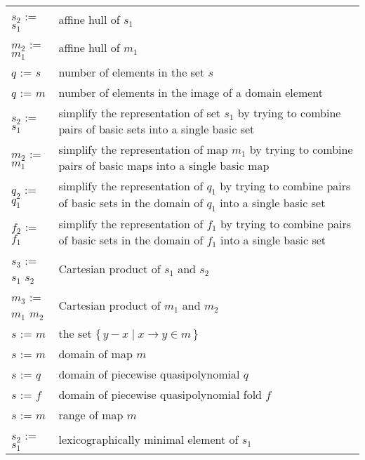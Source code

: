 \label{t:iscc}
\tablelasttail{}
\begin{supertabular}{lp{0.7\textwidth}}
$s_2$ :=  $s_1$ & affine hull of $s_1$
\\
$m_2$ :=  $m_1$ & affine hull of $m_1$
\\
$q$ :=  $s$ &
number of elements in the set $s$
\\
$q$ :=  $m$ &
number of elements in the image of a domain element
\\
$s_2$ :=  $s_1$ &
simplify the representation of set $s_1$ by trying
to combine pairs of basic sets into a single
basic set
\\
$m_2$ :=  $m_1$ &
simplify the representation of map $m_1$ by trying
to combine pairs of basic maps into a single
basic map
\\
$q_2$ :=  $q_1$ &
simplify the representation of $q_1$ by trying
to combine pairs of basic sets in the domain
of $q_1$ into a single basic set
\\
$f_2$ :=  $f_1$ &
simplify the representation of $f_1$ by trying
to combine pairs of basic sets in the domain
of $f_1$ into a single basic set
\\
$s_3$ := $s_1$  $s_2$ &
Cartesian product of $s_1$ and $s_2$
\\
$m_3$ := $m_1$  $m_2$ &
Cartesian product of $m_1$ and $m_2$
\\
$s$ :=  $m$ &
the set $\{\, y - x \mid x \to y \in m \,\}$
\\
$s$ :=  $m$ &
domain of map $m$
\\
$s$ :=  $q$ &
domain of piecewise quasipolynomial $q$
\\
$s$ :=  $f$ &
domain of piecewise quasipolynomial fold $f$
\\
$s$ :=  $m$ &
range of map $m$
\\
$s_2$ :=  $s_1$ &
lexicographically minimal element of $s_1$
\\

\end{supertabular}
